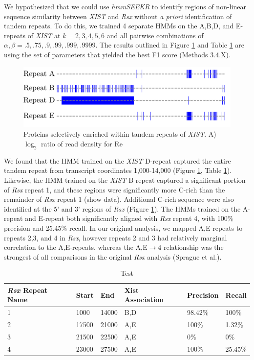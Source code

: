 We hypothesized that we could use \emph{hmmSEEKR} to identify regions of non-linear sequence similarity between \emph{XIST} and \emph{Rsx} without \emph{a priori} identification of tandem repeats. To do this, we trained 4 separate HMMs on the A,B,D, and E-repeats of \emph{XIST} at $k=2,3,4,5,6$ and all pairwise combinations of $\alpha,\beta = .5,.75,.9,.99,.999,.9999$. The results outlined in Figure \ref{fig:koalarsxhmm} and Table \ref{tbl:rsxresults} are using the set of parameters that yielded the best F1 score (Methods 3.4.X). 


\begin{figure}[h!]
\centering
\includegraphics[width=\textwidth]{images/koalarsx.pdf}
\caption{Proteins selectively enriched within tandem repeats of \emph{XIST}. A) $\log_2$ ratio of read density for Re}
\label{fig:koalarsxhmm}
\end{figure}

We found that the HMM trained on the \emph{XIST} D-repeat captured the entire tandem repeat from transcript coordinates 1,000-14,000 (Figure \ref{fig:koalarsxhmm}, Table \ref{tbl:rsxresults}). Likewise, the HMM trained on the \emph{XIST} B-repeat captured a significant portion of \emph{Rsx} repeat 1, and these regions were significantly more C-rich than the remainder of \emph{Rsx} repeat 1 (show data). Additional C-rich sequence were also identified at the 5' and 3' regions of \emph{Rsx} (Figure \ref{fig:koalarsxhmm}). The HMMs trained on the A-repeat and E-repeat both significantly aligned with \emph{Rsx} repeat 4, with 100\% precision and 25.45\% recall. In our original analysis, we mapped A,E-repeats to repeats 2,3, and 4 in \emph{Rsx}, however repeats 2 and 3 had relatively marginal correlation to the A,E-repeats, whereas the A,E$\rightarrow$4 relationship was the strongest of all comparisons in the original \emph{Rsx} analysis (Sprague et al.).

\begin{table}[h!]
\centering
\begin{tabular}{|l|l|l|l|l|l|}
\hline 
\emph{Rsx} Repeat Name& Start & End   & Xist Association   & Precision& Recall                      \\
\hline 
    1&  1000   & 14000    & B,D     & 98.42\% & 100\% \\
      2&17500 & 21000  & A,E     & 100\%   & 1.32\% \\
      3&21500  & 22500   & A,E      & 0\% & 0\%  \\
      4&23000 & 27500  & A,E     & 100\%   & 25.45\% \\
\hline 
\end{tabular}
\caption{Test}
\label{tbl:rsxresults}
\end{table}


